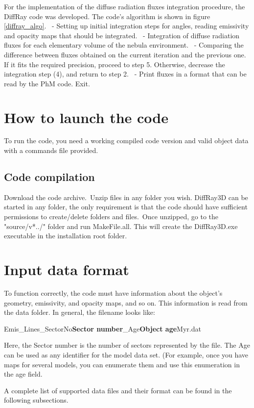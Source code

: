 \documentclass[a4paper]{article}
\begin{document}
For the implementation of the diffuse radiation fluxes integration procedure, the DiffRay code was developed. The code's algorithm is shown in figure \ref{diffray_algo}.\
 - Setting up initial integration steps for angles, reading emissivity and opacity maps that should be integrated.\
 - Integration of diffuse radiation fluxes for each elementary volume of the nebula environment.\
 - Comparing the difference between fluxes obtained on the current iteration and the previous one. If it fits the required precision, proceed to step 5. Otherwise, decrease the integration step (4), and return to step 2.\
 - Print fluxes in a format that can be read by the PhM code. Exit.\

\section{How to launch the code}

To run the code, you need a working compiled code version and valid object data with a commands file provided.

\subsection{Code compilation}

Download the code archive.\
Unzip files in any folder you wish. DiffRay3D can be started in any folder, the only requirement is that the code should have sufficient permissions to create/delete folders and files.\
Once unzipped, go to the "source/v*../" folder and run MakeFile.all. This will create the DiffRay3D.exe executable in the installation root folder.\
\section{Input data format}
To function correctly, the code must have information about the object's geometry, emissivity, and opacity maps, and so on. This information is read from the data folder. In general, the filename looks like:

Emis_Lines_SectorNo{\bf Sector number}_Age{\bf Object age}Myr.dat

Here, the Sector number is the number of sectors represented by the file. The Age can be used as any identifier for the model data set. (For example, once you have maps for several models, you can enumerate them and use this enumeration in the age field.

A complete list of supported data files and their format can be found in the following subsections.
\end{document}
